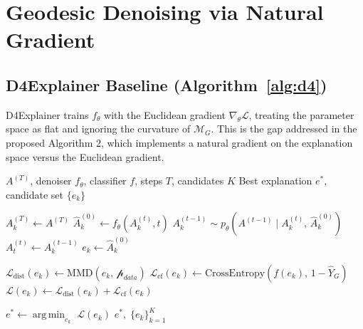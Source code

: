 \documentclass[11pt]{article}
\newcommand{\MG}{\mathcal{M}_G}
\begin{document}
\section{Geodesic Denoising via Natural Gradient}

\subsection{D4Explainer Baseline (Algorithm~\ref{alg:d4})}

D4Explainer trains $f_\theta$ with the Euclidean gradient $\nabla_\theta \mathcal{L}$,
treating the parameter space as flat and ignoring the curvature of $\MG$.
This is the gap addressed in the proposed Algorithm 2, which implements a natural gradient on the explanation space versus the Euclidean gradient.

\begin{algorithm}[H]
\caption{D4Explainer Reverse Diffusion (Baseline)}
\label{alg:d4}
\begin{algorithmic}[1]
\Require $A^{(T)}$, denoiser $f_\theta$, classifier $f$, steps $T$, candidates $K$
\Ensure Best explanation $e^*$, candidate set $\{e_k\}$

                     
  \State $A_k^{(T)} \leftarrow A^{(T)}$
    \State $\widehat{A}_k^{(0)} \leftarrow f_\theta\!\left(A_k^{(t)}, t\right)$
    \State $A_k^{(t-1)} \sim p_\theta\!\left(A^{(t-1)} \mid
           A_k^{(t)},\, \widehat{A}_k^{(0)}\right)$
    \State $A^{(t)}_t \leftarrow A_k^{(t-1)}$
  \EndFor
  \State $e_k \leftarrow \widehat{A}_k^{(0)}$
\EndFor

                        
  \State $\mathcal{L}_{\mathrm{dist}}(e_k)
         \leftarrow \mathrm{MMD}\!\left(e_k,\, \mathcal{p}_{data}\right)$
  \State $\mathcal{L}_{\mathrm{cf}}(e_k)
         \leftarrow \mathrm{CrossEntropy}\!\left(f(e_k),\, 1 - \hat{Y}_G\right)$
  \State $\mathcal{L}(e_k) \leftarrow
         \mathcal{L}_{\mathrm{dist}}(e_k) + \mathcal{L}_{\mathrm{cf}}(e_k)$
\EndFor

\State $e^* \leftarrow \operatorname*{arg\,min}_{e_k}\; \mathcal{L}(e_k)$
\State \Return $e^*,\; \{e_k\}_{k=1}^K$
\end{algorithmic}
\end{algorithm}
\end{document}
